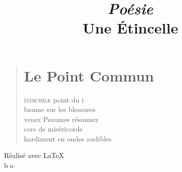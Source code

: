 \documentclass[a4paper,12pt,openright]{book}
\begin{document}
\newcommand{\lb}[1]{\color{lightblue} #1}

  \newcommand{\bleu}[1]{\color{bleu} #1}

\pagestyle{empty}
\title{\hbox{}
       \huge\bf
       \textit{Poésie}       
\\
  {\bleu Une Étincelle}
  \\ 
       }
\date{}
\maketitle
\begin{verse}
\settowidth{\versewidth}{de nouveau de nous}
\vspace{1cm}
\section*{Le Point Commun}
\vspace{1cm}
{\lettrine[lines=1]{\textcolor[gray]{0.6}{i}}{\space ndicible} point du i}\\
baume sur les blessures\\
venez Psaumes résonnez\\
cors de miséricorde\\
hardiment en ondes audibles


\vspace{2cm}
\begin{center}
\end{center}



\end{verse}





\vfill




\begin{center}
\baselineskip=60pt 

\vspace*{12.5cm}
Réalisé avec \LaTeX
\\
\vspace*{1.5cm}
{\lb \LARGE \textcircled {bo}}
\end{center}
\end{document}
